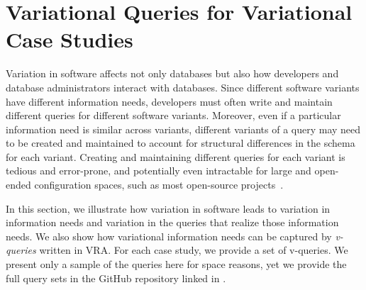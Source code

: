 \section{Variational Queries for Variational Case Studies}
\label{sec:q}


Variation in software affects not only databases but also how developers and
database administrators interact with databases.
%
Since different software variants have different information needs, developers
must often write and maintain different queries for different software
variants. Moreover, even if a particular information need is similar across
variants, different variants of a query may need to be created and maintained
to account for structural differences in the schema for each variant.
%
Creating and maintaining different queries for each variant is tedious and
error-prone, and potentially even intractable for large and open-ended
configuration spaces, such as most open-source projects~\cite{ATW18poly}.


In this section, we illustrate how variation in software leads to variation in
information needs and variation in the queries that realize those information
needs. We also show how variational information needs can be captured by
\emph{v-queries} written in VRA.
%
For each case study, we provide a set of v-queries.
%
We present only a  sample of the queries here for space reasons,
yet we provide the full query sets in the GitHub repository linked in .
%


